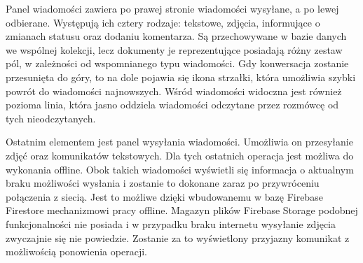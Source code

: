 Panel wiadomości zawiera po prawej stronie wiadomości wysyłane, a po lewej odbierane. Występują ich cztery rodzaje: tekstowe, zdjęcia, informujące o zmianach statusu oraz dodaniu komentarza. Są przechowywane w bazie danych we wspólnej kolekcji, lecz dokumenty je reprezentujące posiadają różny zestaw pól, w zależności od wspomnianego typu wiadomości.
Gdy konwersacja zostanie przesunięta do góry, to na dole pojawia się ikona strzałki, która umożliwia szybki powrót do wiadomości najnowszych. Wśród wiadomości widoczna jest również pozioma linia, która jasno oddziela wiadomości odczytane przez rozmówcę od tych nieodczytanych.

Ostatnim elementem jest panel wysyłania wiadomości. Umożliwia on przesyłanie zdjęć oraz komunikatów tekstowych. Dla tych ostatnich operacja jest możliwa do wykonania offline. Obok takich wiadomości wyświetli się informacja o aktualnym braku możliwości wysłania i zostanie to dokonane zaraz po przywróceniu połączenia z siecią. Jest to możliwe dzięki wbudowanemu w bazę Firebase Firestore mechanizmowi pracy offline. Magazyn plików Firebase Storage podobnej funkcjonalności nie posiada i w przypadku braku internetu wysyłanie zdjęcia zwyczajnie się nie powiedzie. Zostanie za to wyświetlony przyjazny komunikat z możliwością ponowienia operacji.